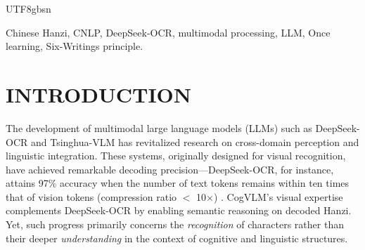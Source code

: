 \documentclass[conference]{IEEEtran}
\begin{document}
\begin{CJK*}{UTF8}{gbsn}


\begin{IEEEkeywords}
Chinese Hanzi, CNLP, DeepSeek-OCR, multimodal processing, LLM, Once learning, Six-Writings principle.
\end{IEEEkeywords}

\section{INTRODUCTION}

The development of multimodal large language models (LLMs) such as DeepSeek-OCR \cite{wei2025deepseek} and Tsinghua-VLM \cite{wang2024cogvlm} has revitalized research on cross-domain perception and linguistic integration. These systems, originally designed for visual recognition, have achieved remarkable decoding precision—DeepSeek-OCR, for instance, attains 97\% accuracy when the number of text tokens remains within ten times that of vision tokens (compression ratio $<$ 10×) \cite{wei2025deepseek}. CogVLM's visual expertise complements DeepSeek-OCR by enabling semantic reasoning on decoded Hanzi. Yet, such progress primarily concerns the \textit{recognition} of characters rather than their deeper \textit{understanding} in the context of cognitive and linguistic structures.


\end{CJK*}
\end{document}
